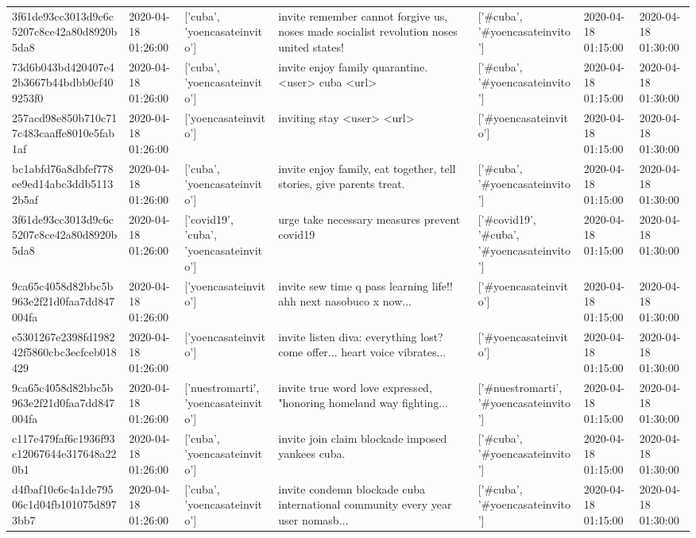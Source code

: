 \begin{tabular}{lllllll}
3f61de93cc3013d9c6c5207c8ce42a80d8920b5da8 & 2020-04-18 01:26:00 & ['cuba', 'yoencasateinvito'] & invite remember cannot forgive us, noses made socialist revolution noses united states! & ['#cuba', '#yoencasateinvito'] & 2020-04-18 01:15:00 & 2020-04-18 01:30:00 \\
73d6b043bd420407e42b3667b44bdbb0cf409253f0 & 2020-04-18 01:26:00 & ['cuba', 'yoencasateinvito'] & invite enjoy family quarantine. <user> cuba <url> & ['#cuba', '#yoencasateinvito'] & 2020-04-18 01:15:00 & 2020-04-18 01:30:00 \\
257acd98e850b710c717c483caaffe8010e5fab1af & 2020-04-18 01:26:00 & ['yoencasateinvito'] & inviting stay <user> <url> & ['#yoencasateinvito'] & 2020-04-18 01:15:00 & 2020-04-18 01:30:00 \\
bc1abfd76a8dbfef778ee9ed14abc3ddb51132b5af & 2020-04-18 01:26:00 & ['cuba', 'yoencasateinvito'] & invite enjoy family, eat together, tell stories, give parents treat. & ['#cuba', '#yoencasateinvito'] & 2020-04-18 01:15:00 & 2020-04-18 01:30:00 \\
3f61de93cc3013d9c6c5207c8ce42a80d8920b5da8 & 2020-04-18 01:26:00 & ['covid19', 'cuba', 'yoencasateinvito'] & urge take necessary measures prevent covid19 & ['#covid19', '#cuba', '#yoencasateinvito'] & 2020-04-18 01:15:00 & 2020-04-18 01:30:00 \\
9ca65c4058d82bbc5b963e2f21d0faa7dd847004fa & 2020-04-18 01:26:00 & ['yoencasateinvito'] & invite sew time q pass learning life!! ahh next nasobuco x now... & ['#yoencasateinvito'] & 2020-04-18 01:15:00 & 2020-04-18 01:30:00 \\
e5301267e2398fd198242f5860cbc3ecfceb018429 & 2020-04-18 01:26:00 & ['yoencasateinvito'] & invite listen diva: everything lost? come offer... heart voice vibrates... & ['#yoencasateinvito'] & 2020-04-18 01:15:00 & 2020-04-18 01:30:00 \\
9ca65c4058d82bbc5b963e2f21d0faa7dd847004fa & 2020-04-18 01:26:00 & ['nuestromarti', 'yoencasateinvito'] & invite true word love expressed, "honoring homeland way fighting... & ['#nuestromarti', '#yoencasateinvito'] & 2020-04-18 01:15:00 & 2020-04-18 01:30:00 \\
c117e479faf6c1936f93c12067644e317648a220b1 & 2020-04-18 01:26:00 & ['cuba', 'yoencasateinvito'] & invite join claim blockade imposed yankees cuba. & ['#cuba', '#yoencasateinvito'] & 2020-04-18 01:15:00 & 2020-04-18 01:30:00 \\
d4fbaf10c6c4a1de79506c1d04fb101075d8973bb7 & 2020-04-18 01:26:00 & ['cuba', 'yoencasateinvito'] & invite condemn blockade cuba international community every year user nomasb... & ['#cuba', '#yoencasateinvito'] & 2020-04-18 01:15:00 & 2020-04-18 01:30:00 \\

\end{tabular}
